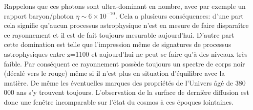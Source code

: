 Rappelons que ces photons sont ultra-dominant en nombre, avec par exemple un rapport baryon/photon $\eta\sim6\times 10^{-10}$. Cela a plusieurs conséquences: d'une part cela signifie qu'aucun processus astrophysique n'est en mesure de faire disparaître ce rayonnement et il est de fait toujours mesurable aujourd'hui. D'autre part cette domination est telle que l'impression même de signatures de processus astrophysiques entre z=1100 et aujourd'hui ne peut se faire qu'à des niveaux très faible. Par conséquent ce rayonnement possède toujours un spectre de corps noir (décalé vers le rouge) même si il n'est plus en situation d'équilibre avec la matière. De même les éventuelles marques des propriétés de l'Univers âgé de 380 000 ans s'y trouvent toujours. L'observation de la surface de dernière diffusion est donc une fenêtre incomparable sur l'état du cosmos à ces époques lointaines.




